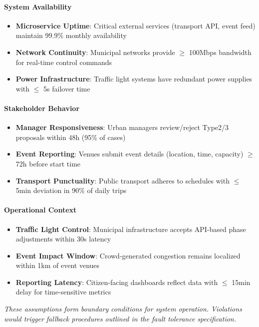 \documentclass[11.5pt]{article}
\begin{document}
    \paragraph{System Availability}
    \begin{itemize}
        \item \textbf{Microservice Uptime}: Critical external services (transport API, event feed) maintain 99.9\% monthly availability
        \item \textbf{Network Continuity}: Municipal networks provide $\ge$ 100Mbps bandwidth for real-time control commands
        \item \textbf{Power Infrastructure}: Traffic light systems have redundant power supplies with $\le$ 5s failover time
    \end{itemize}
    
    \paragraph{Stakeholder Behavior}
    \begin{itemize}
        \item \textbf{Manager Responsiveness}: Urban managers review/reject Type2/3 proposals within 48h (95\% of cases)
        \item \textbf{Event Reporting}: Venues submit event details (location, time, capacity) $\ge$ 72h before start time
        \item \textbf{Transport Punctuality}: Public transport adheres to schedules with $\le$ 5min deviation in 90\% of daily trips
    \end{itemize}
    
    \paragraph{Operational Context}
    \begin{itemize}
        \item \textbf{Traffic Light Control}: Municipal infrastructure accepts API-based phase adjustments within 30s latency
        \item \textbf{Event Impact Window}: Crowd-generated congestion remains localized within 1km of event venues
        \item \textbf{Reporting Latency}: Citizen-facing dashboards reflect data with $\le$ 15min delay for time-sensitive metrics
    \end{itemize}
    
    \noindent\textit{These assumptions form boundary conditions for system operation. Violations would trigger fallback procedures outlined in the fault tolerance specification.}
    
\end{document}
